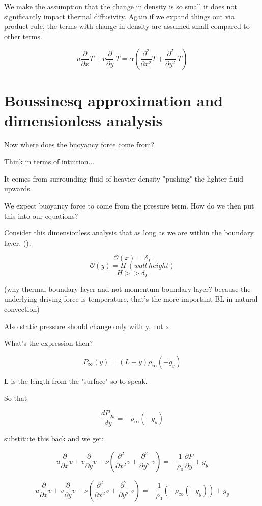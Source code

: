 \documentclass[11pt]{article}
\begin{document}
We make the assumption that the change in density is so small it does not significantly impact thermal diffusivity. Again if we expand things out via product rule, the terms with change in density are assumed small compared to other terms.

$$ u \frac{\partial}{\partial x} T + v \frac{\partial }{\partial y} \ T = \alpha ( \frac{\partial^2}{\partial x^2} T +  \frac{\partial^2 }{\partial y^2} \ T ) $$ 

\section{Boussinesq approximation and dimensionless analysis}
Now where does the buoyancy force come from?

Think in terms of intuition...

It comes from surrounding fluid of heavier density "pushing" the lighter fluid upwards.

We expect buoyancy force to come from the pressure term. How do we then put this into our equations?

Consider this dimensionless analysis that as long as we are within the boundary layer, (\cite{bejan2013convection}):

$$\mathcal{O}(x) = \delta_T$$
$$\mathcal{O}(y) = H \ (wall\ height)$$
$$H >> \delta_T$$


(why thermal boundary layer and not momentum boundary layer? because the underlying driving force is temperature, that's the more important BL in natural convection)

Also static pressure should change only with y, not x.

What's the expression then?

$$P_\infty (y) = (L-y)\rho_\infty (-g_y) $$ 

L is the length from the "surface" so to speak.

So that

$$\frac{d P_\infty}{dy} = -\rho_\infty (-g_y)$$

substitute this back and we get:

$$ u \frac{\partial}{\partial x} v + v \frac{\partial}{\partial y} v  - \nu ( \frac{\partial^2}{\partial x^2} v + \frac{\partial^2}{\partial y^2} \ v ) = - \frac{1}{\rho_0} \frac{\partial P}{\partial y} +g_y$$

$$ u \frac{\partial}{\partial x} v + v \frac{\partial}{\partial y} v  - \nu ( \frac{\partial^2}{\partial x^2} v + \frac{\partial^2}{\partial y^2} \ v ) = - \frac{1}{\rho_0} (-\rho_\infty (-g_y)) +g_y$$
\end{document}
